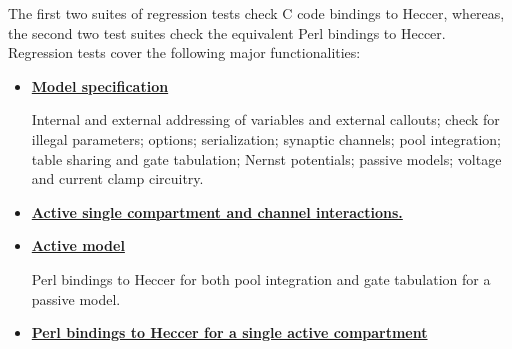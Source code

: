 \documentclass[12pt]{article}
\begin{document}
The first two suites of regression tests check C code bindings to Heccer, whereas, the second two test suites check the equivalent Perl bindings to Heccer. Regression tests cover the following major functionalities:
\begin{itemize}
\item[]\href{http://neurospaces.sourceforge.net/neurospaces_project/heccer/tests/html/specifications/main.html}{\bf Model specification}

Internal and external addressing of variables and external callouts; check for illegal parameters; options; serialization; synaptic channels; pool integration; table sharing and gate tabulation; Nernst potentials; passive models; voltage and current clamp circuitry.

\item[]\href{http://neurospaces.sourceforge.net/neurospaces_project/heccer/tests/html/specifications/active/main.html}{\bf Active single compartment and channel interactions.}

\item[]\href{http://neurospaces.sourceforge.net/neurospaces_project/heccer/tests/html/specifications/glue/swig/perl/main.html}{\bf Active model}

Perl bindings to Heccer for both pool integration and gate tabulation for a passive model.

\item[]\href{http://neurospaces.sourceforge.net/neurospaces_project/heccer/tests/html/specifications/glue/swig/perl/active/main.html}{\bf Perl bindings to Heccer for a single active compartment}
\end{itemize}
\end{document}
